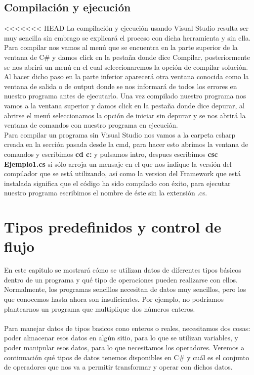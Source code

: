\documentclass[12pt,a4paper]{report}
\begin{document}
{\section{Compilación y ejecución}
<<<<<<< HEAD
La compilación y ejecución usando Visual Studio resulta ser muy sencilla sin embrago se explicará el proceso con dicha herramienta y sin ella.\\Para compilar nos vamos al menú que se encuentra en la parte superior de la ventana de C\# y damos click en la pestaña donde dice Compilar, posteriormente se nos abrirá un menú en el cual seleccionaremos la opción de compilar solución. Al hacer dicho paso en la parte inferior aparecerá otra ventana conocida como la ventana de salida o de output donde se nos informará de todos los errores en nuestro programa antes de ejecutarlo. Una vez compilado nuestro programa nos vamos a la ventana superior y damos click en la pestaña donde dice depurar, al abrirse el menú seleccionamos la opción de iniciar sin depurar y se nos abrirá la ventana de comandos con nuestro programa en ejecución.\\Para compilar un programa sin Visual Studio nos vamos a la carpeta csharp creada en la sección pasada desde la cmd, para hacer esto abrimos la ventana de comandos y escribimos \textbf{cd c:\csharp} y pulsamos intro, despues escribimos \textbf{csc Ejemplo1.cs} si sólo arroja un mensaje en el que nos indique la versión del compilador que se está utilizando, así como la version del Framework que está instalada significa que el código ha sido compilado con éxito, para ejecutar nuestro programa escribimos el nombre de éste sin la extensión .cs.


\chapter{Tipos predefinidos y control de flujo}
En este capitulo se mostrará cómo se utilizan datos de diferentes tipos básicos dentro de un programa y qué tipo de operaciones pueden realizarse con ellos.\\Normalmente, los programas sencillos necesitan de datos muy sencillos, pero los que conocemos hasta ahora son insuficientes. Por ejemplo, no podríamos plantearnos un programa que multiplique dos números enteros.\\\\Para manejar datos de tipos basicos cono enteros o reales, necesitamos dos cosas: poder almacenar esos datos en algún sitio, para lo que se utilizan variables, y poder manipular esos datos, para lo que necesitamos los operadores. Veremos a continuación qué tipos de datos tenemos disponibles en C\# y cuál es el conjunto de operadores que nos va a permitir transformar y operar con dichos datos.
}
\end{document}
